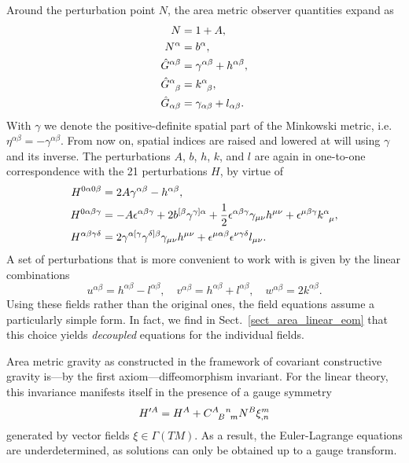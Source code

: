 Around the perturbation point $N$, the area metric observer quantities expand as
\begin{equation}
  \begin{aligned}
    N &{} = 1 + A, \\
    N^\alpha &{} = b^\alpha, \\
    \hat G^{\alpha\beta} &{} = \gamma^{\alpha\beta} + h^{\alpha\beta}, \\
    \hat G^\alpha_{\hphantom\alpha\beta} &{} = k^\alpha_{\hphantom\alpha\beta}, \\
    \hat G_{\alpha\beta} &{} = \gamma_{\alpha\beta} + l_{\alpha\beta}.
  \end{aligned}
\end{equation}
With $\gamma$ we denote the positive-definite spatial part of the Minkowski metric, i.e.~$\eta^{\alpha\beta} = - \gamma^{\alpha\beta}$. From now on, spatial indices are raised and lowered at will using $\gamma$ and its inverse. The perturbations $A$, $b$, $h$, $k$, and $l$ are again in one-to-one correspondence with the 21 perturbations $H$, by virtue of
\begin{equation}\label{area_metric_perturbation}
  \begin{aligned}
    H^{0\alpha0\beta} &{} = 2 A \gamma^{\alpha\beta} - h^{\alpha\beta}, \\
    H^{0\alpha\beta\gamma} &{} = -A \epsilon^{\alpha\beta\gamma} + 2 b^{\lbrack\beta} \gamma^{\gamma\rbrack\alpha} + \frac{1}{2} \epsilon^{\alpha\beta\gamma} \gamma_{\mu\nu} h^{\mu\nu} + \epsilon^{\mu\beta\gamma} k^\alpha_{\hphantom\alpha\mu}, \\
    H^{\alpha\beta\gamma\delta} &{} = 2\gamma^{\alpha\lbrack\gamma}\gamma^{\delta\rbrack\beta} \gamma_{\mu\nu} h^{\mu\nu} + \epsilon^{\mu\alpha\beta} \epsilon^{\nu\gamma\delta} l_{\mu\nu}.
  \end{aligned}
\end{equation}
A set of perturbations that is more convenient to work with is given by the linear combinations
\begin{equation}
  u^{\alpha\beta} = h^{\alpha\beta} - l^{\alpha\beta},\quad v^{\alpha\beta} = h^{\alpha\beta} + l^{\alpha\beta},\quad w^{\alpha\beta} = 2 k^{\alpha\beta}.
\end{equation}
Using these fields rather than the original ones, the field equations assume a particularly simple form. In fact, we find in Sect.~\ref{sect_area_linear_eom} that this choice yields \emph{decoupled} equations for the individual fields.

Area metric gravity as constructed in the framework of covariant constructive gravity is---by the first axiom---diffeomorphism invariant. For the linear theory, this invariance manifests itself in the presence of a gauge symmetry
\begin{equation}\label{area_gauge_transform}
  H^{\prime A} = H^A + \gmc{A}{B}{n}{m} N^B \xi^m_{,n}
\end{equation}
generated by vector fields $\xi \in \Gamma(TM)$. As a result, the Euler-Lagrange equations are underdetermined, as solutions can only be obtained up to a gauge transform.

